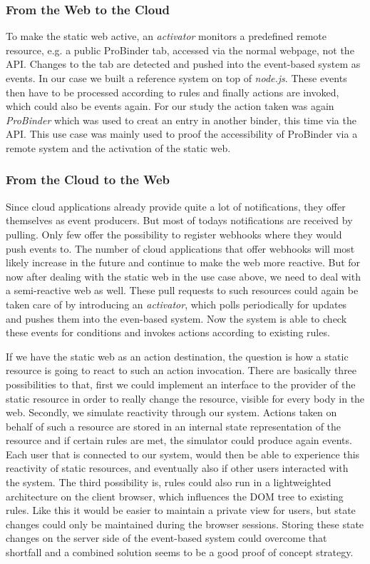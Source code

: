 \documentclass[11pt]{article}%
\begin{document}
\subsubsection{From the Web to the Cloud}
To make the static web active, an \emph{activator} monitors a predefined remote resource, e.g. a public ProBinder tab, accessed via the normal webpage, not the API. Changes to the tab are detected and pushed into the event-based system as events. In our case we built a reference system on top of \emph{node.js}. These events then have to be processed according to rules and finally actions are invoked, which could also be events again. For our study the action taken was again \emph{ProBinder} which was used to creat an entry in another binder, this time via the API. This use case was mainly used to proof the accessibility of ProBinder via a remote system and the activation of the static web.

\subsubsection{From the Cloud to the Web}
Since cloud applications already provide quite a lot of notifications, they offer themselves as event producers. But most of todays notifications are received by pulling. Only few offer the possibility to register webhooks where they would push events to. The number of cloud applications that offer webhooks will most likely increase in the future and continue to make the web more reactive. But for now after dealing with the static web in the use case above, we need to deal with a semi-reactive web as well. These pull requests to such resources could again be taken care of by introducing an \emph{activator}, which polls periodically for updates and pushes them into the even-based system. 
Now the system is able to check these events for conditions and invokes actions according to existing rules.

If we have the static web as an action destination, the question is how a static resource is going to react to such an action invocation. There are basically three possibilities to that, first we could implement an interface to the provider of the static resource in order to really change the resource, visible for every body in the web.
Secondly, we simulate reactivity through our system. Actions taken on behalf of such a resource are stored in an internal state representation of the resource and if certain rules are met, the simulator could produce again events. Each user that is connected to our system, would then be able to experience this reactivity of static resources, and eventually also if other users interacted with the system.
The third possibility is, rules could also run in a lightweighted architecture on the client browser, which influences the DOM tree to existing rules. Like this it would be easier to maintain a private view for users, but state changes could only be maintained during the browser sessions. Storing these state changes on the server side of the event-based system could overcome that shortfall and a combined solution seems to be a good proof of concept strategy. 
\end{document}
